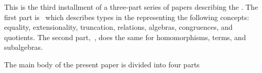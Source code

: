 \documentclass[a4paper,UKenglish,cleveref,autoref,thm-restate,12pt]{../lipics-v2021-wjd}
\begin{document}
This is the third installment of a three-part series of papers describing the \agdaualib. The first part is~\cite{DeMeo:2021-1} which describes types in the \ualib representing the following concepts: equality, extensionality, truncation, relations, algebras, congruences, and quotients. The second part,~\cite{DeMeo:2021-2}, does the same for homomorphisms, terms, and subalgebras.


The main body of the present paper is divided into four parts 







\end{document}
